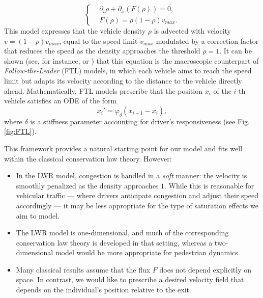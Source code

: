 \documentclass[11pt,twoside]{article}
\numberwithin{equation}{section}
\begin{document}
\begin{equation}
\left\{\begin{aligned}
 &\partial_t \rho + \partial_x (F(\rho)) = 0, \\
 &F(\rho) = \rho(1-\rho)v_{max}.
\end{aligned}\right.
\end{equation}
This model expresses that the vehicle density \(\rho\) is advected with velocity \(v = (1-\rho)v_{max}\), equal to the speed limit \(v_{max}\) modulated by a correction factor that reduces the speed as the density approaches the threshold \(\rho = 1\). It can be shown (see, for instance, \cite{rossi_justification_2014} or \cite{francesco_rigorous_2015}) that this equation is the macroscopic counterpart of \textit{Follow-the-Leader} (FTL) models, in which each vehicle aims to reach the speed limit but adapts its velocity according to the distance to the vehicle directly ahead. Mathematically, FTL models prescribe that the position \(x_i\) of the \(i\)-th vehicle satisfies an ODE of the form
\[
x_i' = \varphi_\delta(x_{i+1}-x_i),
\]
where \(\delta\) is a stiffness parameter accounting for driver's responsiveness (see Fig. \ref{fig:FTL}).

This framework provides a natural starting point for our model and fits well within the classical conservation law theory. However:

\begin{itemize}[label=$\bullet$]

\item In the LWR model, congestion is handled in a \textit{soft} manner: the velocity is smoothly penalized as the density approaches \(1\). While this is reasonable for vehicular traffic — where drivers anticipate congestion and adjust their speed accordingly — it may be less appropriate for the type of saturation effects we aim to model.

\item The LWR model is one-dimensional, and much of the corresponding conservation law theory is developed in that setting, whereas a two-dimensional model would be more appropriate for pedestrian dynamics.

\item Many classical results assume that the flux \(F\) does not depend explicitly on space. In contrast, we would like to prescribe a desired velocity field that depends on the individual's position relative to the exit.

\end{itemize}
\end{document}
